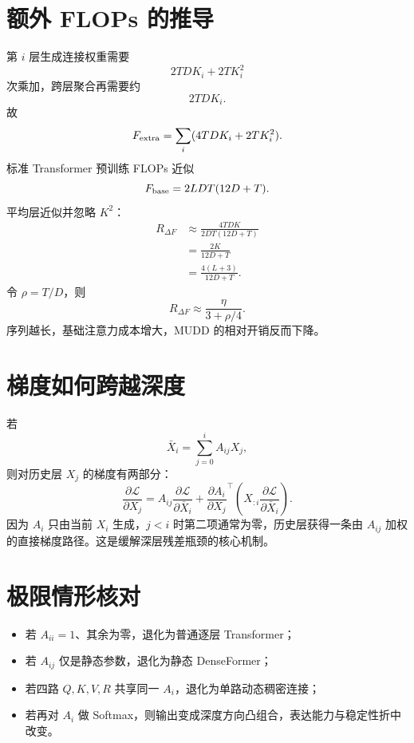 \documentclass[UTF8,12pt,a4paper,fontset=none]{ctexart}
\numberwithin{equation}{section}
\newcommand{\Loss}{\mathcal{L}}
\begin{document}
\section{额外 FLOPs 的推导}
第 $i$ 层生成连接权重需要
\begin{equation}
 2TDK_i+2TK_i^2
\end{equation}
次乘加，跨层聚合再需要约
\begin{equation}
 2TDK_i.
\end{equation}
故
\begin{equation}
 F_{\rm extra}=\sum_i(4TDK_i+2TK_i^2).
\end{equation}
标准 Transformer 预训练 FLOPs 近似
\begin{equation}
 F_{\rm base}=2LDT(12D+T).
\end{equation}
平均层近似并忽略 $K^2$：
\begin{align}
 R_{\Delta F}
 &\approx\frac{4TDK}{2DT(12D+T)}\\
 &=\frac{2K}{12D+T}\\
 &=\frac{4(L+3)}{12D+T}.
\end{align}
令 $\rho=T/D$，则
\begin{equation}
 \boxed{R_{\Delta F}\approx\frac{\eta}{3+\rho/4}}.
\end{equation}
序列越长，基础注意力成本增大，MUDD 的相对开销反而下降。

\section{梯度如何跨越深度}
若
\begin{equation}
 \bar X_i=\sum_{j=0}^{i}A_{ij}X_j,
\end{equation}
则对历史层 $X_j$ 的梯度有两部分：
\begin{equation}
 \frac{\partial\Loss}{\partial X_j}
 =A_{ij}\frac{\partial\Loss}{\partial\bar X_i}
 +\frac{\partial A_i}{\partial X_j}^{\top}
 \left(X_{:i}\frac{\partial\Loss}{\partial\bar X_i}\right).
\end{equation}
因为 $A_i$ 只由当前 $X_i$ 生成，$j<i$ 时第二项通常为零，历史层获得一条由 $A_{ij}$ 加权的直接梯度路径。这是缓解深层残差瓶颈的核心机制。

\section{极限情形核对}
\begin{itemize}[leftmargin=2em]
\item 若 $A_{ii}=1$、其余为零，退化为普通逐层 Transformer；
\item 若 $A_{ij}$ 仅是静态参数，退化为静态 DenseFormer；
\item 若四路 $Q,K,V,R$ 共享同一 $A_i$，退化为单路动态稠密连接；
\item 若再对 $A_i$ 做 Softmax，则输出变成深度方向凸组合，表达能力与稳定性折中改变。
\end{itemize}
\end{document}

